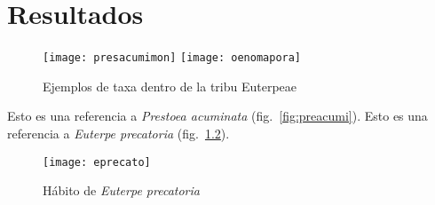 \chapter{Resultados}
\lipsum[1-2]
\begin{comment}


\begin{figure}[!ht]
\begin{subfigure}[b]{.4\textwidth}
  \centering
  \texttt{[image: euteredulis]}
  \caption{\textit{Euterpe edulis}}
  \label{fig:eeduli}
\end{subfigure}%
\begin{subfigure}[b]{.4\textwidth}
  \centering
  \texttt{[image: presacumimon]}
  \caption{\textit{Prestoea acuminata}}
  \label{fig:pacumi}
\end{subfigure}
\begin{subfigure}[b]{.4\textwidth}
  \centering
  \texttt{[image: neoniwatsoni]}
  \caption{\textit{Neonicholsonia watsonii}}
  \label{fig:nwatsonii}
\end{subfigure}
\begin{subfigure}[b]{.4\textwidth}
  \centering
  \texttt{[image: oenomapora]}
  \caption{\textit{Oenocarpus mapora}}
  \label{fig:omapora}
\end{subfigure}
\caption{Genera of palm tribe Euterpeae}
\label{fig:fig}
\end{figure}
\end{comment}

\begin{figure}[!ht]
\centering
{}
{\texttt{[image: presacumimon]}}
{\texttt{[image: oenomapora]}}
\caption{Ejemplos de taxa dentro de la tribu Euterpeae}\label{animals}
\end{figure}

\lipsum[5-8]

Esto es una referencia a \textit{Prestoea acuminata} (fig.~\ref{fig:preacumi}).
Esto es una referencia a \textit{Euterpe precatoria} (fig.~\ref{fig:euterpreca}).
\begin{figure}[!hb]
\centering
\texttt{[image: eprecato]}
\caption{Hábito de \textit{Euterpe precatoria}}
\label{fig:euterpreca}
\end{figure}


